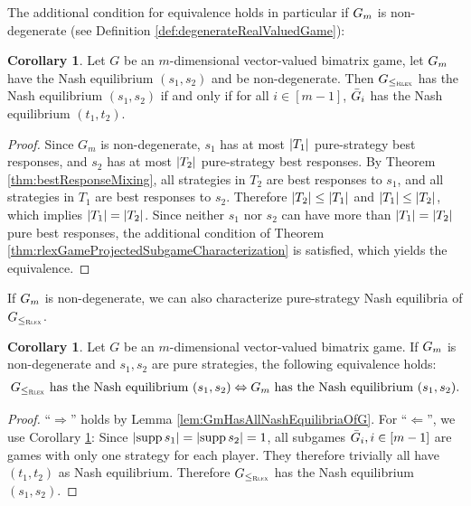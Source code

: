 \documentclass[a4paper,DIV=11,abstracton,twoside=semi]{scrreprt}
\theoremstyle{definition}
\newtheorem{cor}[thm]{Corollary}
\begin{document}
    The additional condition for equivalence holds in particular if $G_{m}$ is non-degenerate (see Definition \ref{def:degenerateRealValuedGame}):
    \begin{cor}        
        \label{cor:degenerateGamesYieldLeqRlexEquivalence}
        Let $G$ be an $m$-dimensional vector-valued bimatrix game, let $G_{m}$ have the Nash equilibrium $(s_1, s_2)$ and be non-degenerate.
        Then $G_{\leq_{\textsc{Rlex}}}$ has the Nash equilibrium $(s_1, s_2)$ if and only if for all $i \in [m-1]$, $\bar{G}_{i}$ has the Nash equilibrium $(t_1, t_2)$.
    \end{cor}
    \begin{proof}
        Since $G_m$ is non-degenerate, $s_1$ has at most $\left| T_1 \right|$ pure-strategy best responses, and $s_2$ has at most $\left| T_2 \right|$ pure-strategy best responses.
        By Theorem \ref{thm:bestResponseMixing}, all strategies in $T_2$ are best responses to $s_1$, and all strategies in $T_1$ are best responses to $s_2$. Therefore $\left| T_2 \right| \leq \left| T_1 \right|$ and $\left| T_1 \right| \leq \left| T_2 \right|$, which implies $\left| T_1 \right| = \left| T_2 \right|$.
        Since neither $s_1$ nor $s_2$ can have more than $\left| T_1 \right| = \left| T_2 \right|$ pure best responses, the additional condition of Theorem \ref{thm:rlexGameProjectedSubgameCharacterization} is satisfied, which yields the equivalence.
    \end{proof}

    If $G_{m}$ is non-degenerate, we can also characterize pure-strategy Nash equilibria of $G_{\leq_{\textsc{Rlex}}}$.
    \begin{cor}
        \label{cor:degenerateGamesYieldPureEquilibriaGmGEquivalence}
        Let $G$ be an $m$-dimensional vector-valued bimatrix game. If $G_{m}$ is non-degenerate and $s_1, s_2$ are pure strategies, the following equivalence holds:
        \begin{gather*}
            \text{$G_{\leq_{\textsc{Rlex}}}$ has the Nash equilibrium $(s_1, s_2) \Leftrightarrow G_{m}$ has the Nash equilibrium $(s_1, s_2)$.}
        \end{gather*}
    \end{cor}
    \begin{proof}
        “$\Rightarrow$” holds by Lemma \ref{lem:GmHasAllNashEquilibriaOfG}.
        For “$\Leftarrow$”, we use Corollary \ref{cor:degenerateGamesYieldLeqRlexEquivalence}: Since $\left| \operatorname{supp} s_1 \right| = \left| \operatorname{supp} s_2 \right| = 1$, all subgames $\bar{G}_{i}, i \in [m-1]$ are games with only one strategy for each player. They therefore trivially all have $(t_1, t_2)$ as Nash equilibrium.
        Therefore $G_{\leq_{\textsc{Rlex}}}$ has the Nash equilibrium $(s_1, s_2)$.
    \end{proof}
\end{document}
